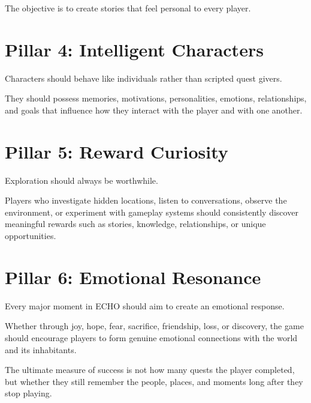 The objective is to create stories that feel personal to every player.

\section{Pillar 4: Intelligent Characters}

Characters should behave like individuals rather than scripted quest givers.

They should possess memories, motivations, personalities, emotions, relationships, and goals that influence how they interact with the player and with one another.

\section{Pillar 5: Reward Curiosity}

Exploration should always be worthwhile.

Players who investigate hidden locations, listen to conversations, observe the environment, or experiment with gameplay systems should consistently discover meaningful rewards such as stories, knowledge, relationships, or unique opportunities.

\section{Pillar 6: Emotional Resonance}

Every major moment in ECHO should aim to create an emotional response.

Whether through joy, hope, fear, sacrifice, friendship, loss, or discovery, the game should encourage players to form genuine emotional connections with the world and its inhabitants.

The ultimate measure of success is not how many quests the player completed, but whether they still remember the people, places, and moments long after they stop playing.